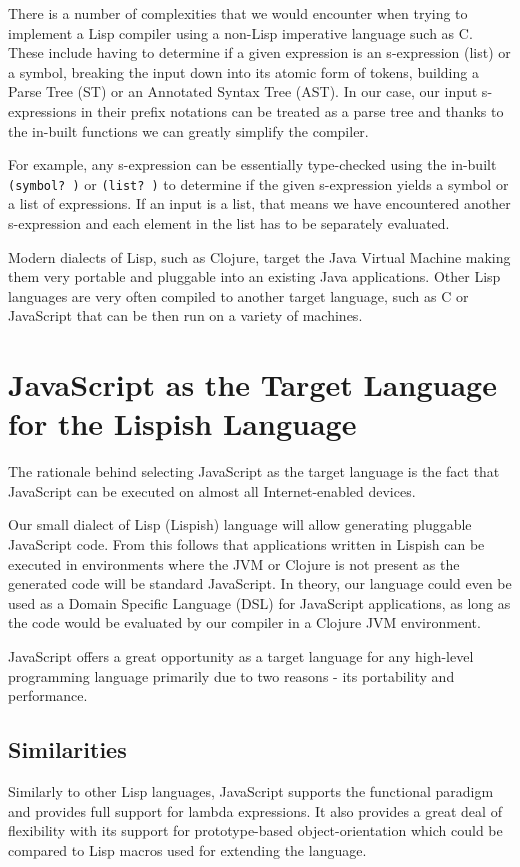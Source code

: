 There is a number of complexities that we would encounter when trying to implement a Lisp compiler using a non-Lisp imperative language such as C.
These include having to determine if a given expression is an s-expression (list) or a symbol, breaking the input down into its atomic form of tokens, building a Parse Tree (ST) or an Annotated Syntax Tree (AST).
In our case, our input s-expressions in their prefix notations can be treated as a parse tree and thanks to the in-built functions we can greatly simplify the compiler.

For example, any s-expression can be essentially type-checked using the in-built \texttt{(symbol? )} or \texttt{(list? )} to determine if the given s-expression yields a symbol or a list of expressions. If an input is a list, that means we have encountered another s-expression and each element in the list has to be separately evaluated.

Modern dialects of Lisp, such as Clojure, target the Java Virtual Machine making them very portable and pluggable into an existing Java applications.
Other Lisp languages are very often compiled to another target language, such as C or JavaScript that can be then run on a variety of machines.

\section{JavaScript as the Target Language for the Lispish Language}
The rationale behind selecting JavaScript as the target language is the fact that JavaScript can be executed on almost all Internet-enabled devices.

Our small dialect of Lisp (Lispish) language will allow generating pluggable JavaScript code.
From this follows that applications written in Lispish can be executed in environments where the JVM or Clojure is not present as the generated code will be standard JavaScript.
In theory, our language could even be used as a Domain Specific Language (DSL) for JavaScript applications, as long as the code would be evaluated by our compiler in a Clojure JVM environment.

JavaScript offers a great opportunity as a target language for any high-level programming language primarily due to two reasons - its portability and performance.

\subsection{Similarities}
Similarly to other Lisp languages, JavaScript supports the functional paradigm and provides full support for lambda expressions. It also provides a great deal of flexibility with its support for prototype-based object-orientation which could be compared to Lisp macros used for extending the language.


